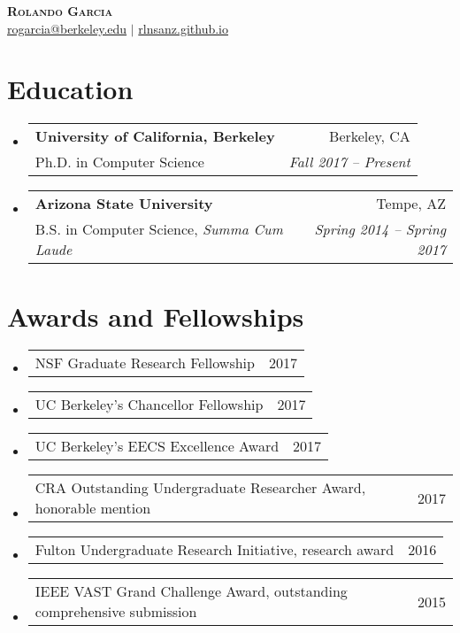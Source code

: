 \documentclass[letterpaper,11pt]{article}
\makeatletter
\newcommand{\resumeSubheading}[4]{
  \vspace{-2pt}\item
    \begin{tabular*}{0.97\textwidth}[t]{l@{\extracolsep{\fill}}r}
      \textbf{#1} & #2 \\
      \small#3 & \textit{\small #4} \\
    \end{tabular*}\vspace{-7pt}
}
\newcommand{\resumeSubSubheading}[2]{
    \item
    \begin{tabular*}{0.97\textwidth}{l@{\extracolsep{\fill}}r}
      #1 & #2 \\
    \end{tabular*}\vspace{-7pt}
}
\newcommand{\resumeSubHeadingListStart}{\begin{itemize}[leftmargin=0.15in, label={}]}
\newcommand{\resumeSubHeadingListEnd}{\end{itemize}}
\makeatother
\begin{document}

\begin{center}
    \textbf{\Huge \scshape Rolando Garcia} \\ \vspace{1pt}
    \href{mailto:rogarcia@berkeley.edu}{rogarcia@berkeley.edu} $|$ 
    \href{https://rlnsanz.github.io}{rlnsanz.github.io} \\ \vspace{1pt}
\end{center}


\section{Education}
  \resumeSubHeadingListStart
    \resumeSubheading
      {University of California, Berkeley}{Berkeley, CA}
      {Ph.D. in Computer Science}{Fall 2017 -- Present}
    \resumeSubheading
      {Arizona State University}{Tempe, AZ}
      {B.S. in Computer Science, \textit{Summa Cum Laude}}{Spring 2014 -- Spring 2017}
  \resumeSubHeadingListEnd

\section{Awards and Fellowships}
    \resumeSubHeadingListStart
        \resumeSubSubheading
            {NSF Graduate Research Fellowship}{2017}
        \resumeSubSubheading
            {UC Berkeley's Chancellor Fellowship}{2017}
        \resumeSubSubheading
            {UC Berkeley's EECS Excellence Award}{2017}
        \resumeSubSubheading
            {CRA Outstanding Undergraduate Researcher Award, honorable mention}{2017}
        \resumeSubSubheading
            {Fulton Undergraduate Research Initiative, research award}{2016}
        \resumeSubSubheading
            {IEEE VAST Grand Challenge Award, outstanding comprehensive submission}{2015}  
    \resumeSubHeadingListEnd
\end{document}
